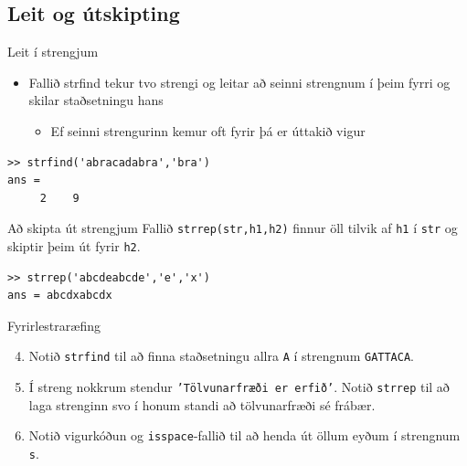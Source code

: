\documentclass{beamer}
\begin{document}
\subsection{Leit og útskipting}

\begin{frame}[fragile]{Leit í strengjum}
\begin{itemize}
 \item Fallið strfind tekur tvo strengi og leitar að seinni strengnum í þeim fyrri og skilar staðsetningu hans
 \begin{itemize}
  \item Ef seinni strengurinn kemur oft fyrir þá er úttakið vigur
 \end{itemize}
\end{itemize}
\begin{verbatim}
>> strfind('abracadabra','bra')
ans =
     2    9
\end{verbatim}
\end{frame}

\begin{frame}[fragile]{Að skipta út strengjum}
Fallið \texttt{strrep(str,h1,h2)} finnur öll tilvik af \texttt{h1} í \texttt{str} og skiptir þeim út fyrir \texttt{h2}.
\begin{verbatim}
>> strrep('abcdeabcde','e','x')
ans = abcdxabcdx
\end{verbatim}
\end{frame}

\begin{frame}{Fyrirlestraræfing}
\begin{enumerate}
\setcounter{enumi}{3}
 \item Notið \texttt{strfind} til að finna staðsetningu allra \texttt{A} í strengnum \texttt{GATTACA}.
 \item Í streng nokkrum stendur \texttt{'Tölvunarfræði er erfið'}. Notið \texttt{strrep} til að laga strenginn svo í honum standi að tölvunarfræði sé frábær.
 \item Notið vigurkóðun og \texttt{isspace}-fallið til að henda út öllum eyðum í strengnum \texttt{s}.
\end{enumerate}
\end{frame}
\end{document}
